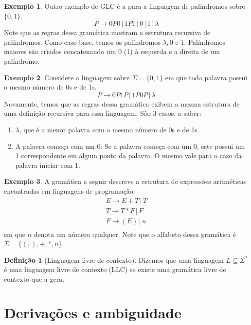 \documentclass[a4paper]{article}
\theoremstyle{definition}
\newtheorem{Example}{Exemplo}
\newtheorem{Definition}{Definição}
\begin{document}
  \begin{Example}
    Outro exemplo de GLC é a para a linguagem de palíndromos sobre $\{0,1\}$.
    \[
      P \to 0P0\,|\,1P1\,|\,0\,|\,1\,|\,\lambda
    \]
    Note que as regras dessa gramática mostram a estrutura recursiva de
    palíndromos. Como caso base, temos os palíndromos $\lambda, 0$ e $1$.
    Palíndromos maiores são criados concatenando um 0 (1) à esquerda e a
    direita de um palíndromo.
  \end{Example}

  \begin{Example}
    Considere a linguagem sobre $\Sigma=\{0,1\}$ em que toda palavra
    possui o mesmo número de 0s e de 1s.
    \[
      P \to 0P1P\,|\,1P0P\,|\,\lambda
    \]
    Novamente, temos que as regras dessa gramática exibem a mesma estrutura
    de uma definição recursiva para essa linguagem. São 3 casos, a saber:
    \begin{enumerate}
      \item $\lambda$, que é a menor palavra com o mesmo número de 0s e de 1s.
      \item A palavra começa com um 0: Se a palavra começa com um 0, este possui
        um 1 correspondente em algum ponto da palavra. O mesmo vale para o caso
        da palavra iniciar com 1.
    \end{enumerate}
  \end{Example}

  \begin{Example}
    A gramática a seguir descreve a estrutura de expressões aritméticas
    encontradas em linguagens de programação.
    \[
      \begin{array}{l}
        E \to E + T\,|\,T\\
        T \to T * F\,|\, F \\
        F \to (E) \,|\, n \\
      \end{array}
    \]
    em que $n$ denota um número qualquer. Note que o alfabeto dessa gramática é
    $\Sigma=\{(,),+,*,n\}$.
  \end{Example}

  \begin{Definition}[Linguagem livre de contexto]
    Dizemos que uma linguagem $L\subseteq \Sigma^*$ é uma linguagem livre de
    contexto (LLC) se existe uma gramática livre de contexto que a gera.
  \end{Definition}
  
  \section{Derivações e ambiguidade}
\end{document}
